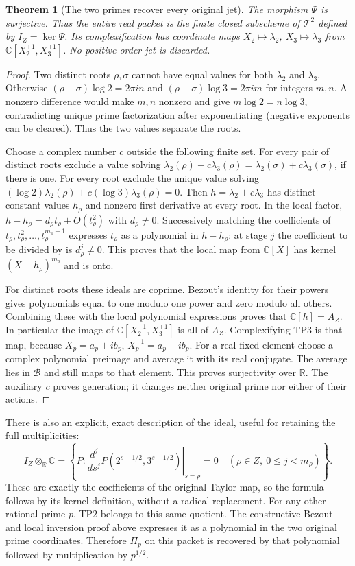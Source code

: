 \documentclass[11pt,a4paper]{article}
\newtheorem{theorem}{Theorem}[section]
\theoremstyle{definition}\newtheorem{definition}[theorem]{Definition}
\newcommand{\C}{\mathbb C}\newcommand{\R}{\mathbb R}
\begin{document}
\begin{theorem}[The two primes recover every original jet]
The morphism $\Psi$ is surjective. Thus the entire real packet is
the finite closed subscheme of $\mathcal T^2$ defined by
$I_Z=\ker\Psi$. Its complexification has coordinate maps
$X_2\mapsto\lambda_2$, $X_3\mapsto\lambda_3$ from
$\C[X_2^{\pm1},X_3^{\pm1}]$. No positive-order jet is discarded.
\end{theorem}
\begin{proof}
Two distinct roots $\rho,\sigma$ cannot have equal values for both
$\lambda_2$ and $\lambda_3$. Otherwise
$(\rho-\sigma)\log2=2\pi i n$ and
$(\rho-\sigma)\log3=2\pi i m$ for integers $m,n$. A nonzero
difference would make $m,n$ nonzero and give $m\log2=n\log3$,
contradicting unique prime factorization after exponentiating
(negative exponents can be cleared). Thus the two values separate
the roots.

Choose a complex number $c$ outside the following finite set.
For every pair of distinct roots exclude a value solving
$\lambda_2(\rho)+c\lambda_3(\rho)
=\lambda_2(\sigma)+c\lambda_3(\sigma)$, if there is one.
For every root exclude the unique value solving
$(\log2)\lambda_2(\rho)+c(\log3)\lambda_3(\rho)=0$.
Then $h=\lambda_2+c\lambda_3$ has distinct constant values
$h_\rho$ and nonzero first derivative at every root. In the local
factor, $h-h_\rho=d_\rho t_\rho+O(t_\rho^2)$ with
$d_\rho\ne0$. Successively matching the coefficients of
$t_\rho,t_\rho^2,\ldots,t_\rho^{m_\rho-1}$ expresses
$t_\rho$ as a polynomial in $h-h_\rho$: at stage $j$ the
coefficient to be divided by is $d_\rho^j\ne0$. This proves
that the local map from $\C[X]$ has kernel
$(X-h_\rho)^{m_\rho}$ and is onto.

For distinct roots these ideals are coprime. Bezout's identity for
their powers gives polynomials equal to one modulo one power and
zero modulo all others. Combining these with the local polynomial
expressions proves that $\C[h]=A_Z$. In particular the image of
$\C[X_2^{\pm1},X_3^{\pm1}]$ is all of $A_Z$. Complexifying TP3
is that map, because $X_p=a_p+ib_p$, $X_p^{-1}=a_p-ib_p$.
For a real fixed element choose a complex polynomial preimage and
average it with its real conjugate. The average lies in $\mathcal B$
and still maps to that element. This proves surjectivity over $\R$.
The auxiliary $c$ proves generation; it changes neither original
prime nor either of their actions.
\end{proof}

There is also an explicit, exact description of the ideal, useful
for retaining the full multiplicities:
\[
 I_Z\otimes_\R\C=
 \left\{P:\left.
 \frac{d^j}{ds^j}P(2^{s-1/2},3^{s-1/2})
 \right|_{s=\rho}=0\quad
 (\rho\in Z,\ 0\le j<m_\rho)\right\}.
 \tag{TP4}\label{tp:ideal}
\]
These are exactly the coefficients of the original Taylor map, so
the formula follows by its kernel definition, without a radical
replacement. For any other rational prime $p$, TP2 belongs to
this same quotient. The constructive Bezout and local inversion
proof above expresses it as a polynomial in the two original
prime coordinates. Therefore $\Pi_p$ on this packet is recovered
by that polynomial followed by multiplication by $p^{1/2}$.
\end{document}
